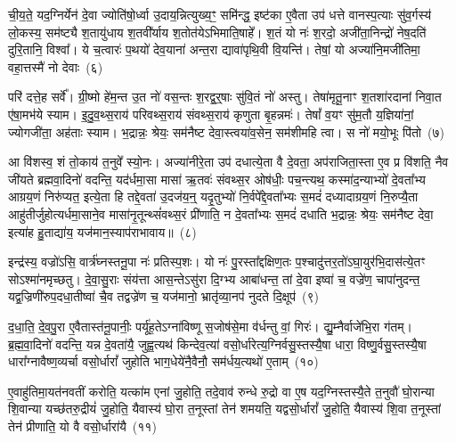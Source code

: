 ची॒य॒ते॒ यद॒ग्निर्येन॑ दे॒वा ज्योति॑षो॒र्ध्वा उ॒दाय॒न्नित्युख्य॒ꣳ॒ समि॑न्द्ध॒ इष्ट॑का ए॒वैता उप॑ धत्ते वानस्प॒त्याः सु॑व॒र्गस्य॑ लो॒कस्य॒ सम॑ष्ट्यै श॒तायु॑धाय श॒तवी᳚र्याय श॒तोत॑ये\-ऽभिमाति॒षाहे᳚। श॒तं यो नः॑ श॒रदो॒ अजी॑ता॒निन्द्रो॑ नेष॒दति॑ दुरि॒तानि॒ विश्वा᳚। ये च॒त्वारः॑ प॒थयो॑ देव॒याना॑ अन्त॒रा द्यावा॑\-पृथि॒वी वि॒यन्ति॑। तेषां॒ यो अज्या॑नि॒मजी॑तिमा॒ वहा॒त्तस्मै॑ नो देवाः~(६)

परि॑ दत्ते॒ह सर्वे᳚। ग्री॒ष्मो हे॑म॒न्त उ॒त नो॑ वस॒न्तः श॒रद्व॒र्॒\mbox{}षाः सु॑वि॒तं नो॑ अस्तु। तेषा॑मृतू॒नाꣳ श॒तशा॑रदानां निवा॒त ए॑षा॒मभ॑ये स्याम। इ॒दु॒व॒थ्स॒राय॑ परिवथ्स॒राय॑ संवथ्स॒राय॑ कृणुता बृ॒हन्नमः॑। तेषां᳚ व॒यꣳ सु॑म॒तौ य॒ज्ञिया॑नां॒ ज्योगजी॑ता॒ अह॑ताः स्याम। भ॒द्रान्नः॒ श्रेयः॒ सम॑नैष्ट देवा॒स्त्वया॑व॒सेन॒ सम॑शीमहि त्वा। स नो॑ मयो॒भूः पि॑तो~(७)

आ वि॑शस्व॒ शं तो॒काय॑ त॒नुवे᳚ स्यो॒नः। अज्या॑नीरे॒ता उप॑ दधात्ये॒ता वै दे॒वता॒ अप॑राजिता॒स्ता ए॒व प्र वि॑शति॒ नैव जी॑यते ब्रह्मवा॒दिनो॑ वदन्ति॒ यद॑र्धमा॒सा मासा॑ ऋ॒तवः॑ संवथ्स॒र ओष॑धीः॒ पच॒न्त्यथ॒ कस्मा॑द॒न्याभ्यो॑ दे॒वता᳚भ्य आग्रय॒णं निरु॑प्यत॒ इत्ये॒ता हि तद्दे॒वता॑ उ॒दज॑य॒न्॒ यदृ॒तुभ्यो॑ नि॒र्वपे᳚द्दे॒वता᳚भ्यः स॒मदं॑ दध्यादाग्रय॒णं नि॒रुप्यै॒ता आहु॑तीर्जुहोत्यर्धमा॒साने॒व मासा॑नृ॒तून्थ्सं॑वथ्स॒रं प्री॑णाति॒ न दे॒वता᳚भ्यः स॒मदं॑ दधाति भ॒द्रान्नः॒ श्रेयः॒ सम॑नैष्ट देवा॒ इत्या॑ह हु॒ताद्या॑य॒ यज॑मान॒स्याप॑राभावाय॥~(८)

{\anuvakamend[{प्रा॒जा॒प॒त्यां लो॒काय॑ देवाः पितो दध्यादाग्रय॒णं पञ्च॑विꣳशतिश्च}]}%

इन्द्र॑स्य॒ वज्रो॑\-ऽसि॒ वार्त्र॑घ्नस्तनू॒पा नः॑ प्रतिस्प॒शः। यो नः॑ पु॒रस्ता᳚द्दक्षिण॒तः प॒श्चादु॑त्तर॒तो॑\-ऽघा॒युर॑भि॒दास॑त्ये॒तꣳ सो\-ऽश्मा॑नमृच्छतु। दे॒वा॒सु॒राः संय॑त्ता आस॒न्ते\-ऽसु॑रा दि॒ग्भ्य आबा॑धन्त॒ तां दे॒वा इष्वा॑ च॒ वज्रे॑ण॒ चापा॑नुदन्त॒ यद्व॒ज्रिणी॑रुप॒दधा॒तीष्वा॑ चै॒व तद्वज्रे॑ण च॒ यज॑मानो॒ भ्रातृ॑व्या॒नप॑ नुदते दि॒क्षूप॑~(९)

द॒धा॒ति॒ दे॒व॒पु॒रा ए॒वैतास्त॑नू॒पानीः॒ पर्यू॑ह॒ते\-ऽग्ना॑विष्णू स॒जोष॑से॒मा व॑र्धन्तु वां॒ गिरः॑। द्यु॒म्नैर्वाजे॑भि॒रा ग॑तम्। ब्र॒ह्म॒वा॒दिनो॑ वदन्ति॒ यन्न दे॒वता॑यै॒ जुह्व॒त्यथ॑ किन्देव॒त्या॑ वसो॒र्धारेत्य॒ग्निर्वसु॒स्तस्यै॒षा धारा॒ विष्णु॒र्वसु॒स्तस्यै॒षा धारा᳚ग्नावैष्ण॒व्यर्चा वसो॒र्धारां᳚ जुहोति भाग॒धेये॑नै॒वैनौ॒ सम॑र्धय॒त्यथो॑ ए॒ताम्~(१०)

ए॒वाहु॑तिमा॒यत॑नवतीं करोति॒ यत्का॑म एनां जु॒होति॒ तदे॒वाव॑ रुन्धे रु॒द्रो वा ए॒ष यद॒ग्निस्तस्यै॒ते त॒नुवौ॑ घो॒रान्या शि॒वान्या यच्छ॑तरु॒द्रीयं॑ जु॒होति॒ यैवास्य॑ घो॒रा त॒नूस्तां तेन॑ शमयति॒ यद्वसो॒र्धारां᳚ जु॒होति॒ यैवास्य॑ शि॒वा त॒नूस्तां तेन॑ प्रीणाति॒ यो वै वसो॒र्धारा॑यै~(११)

